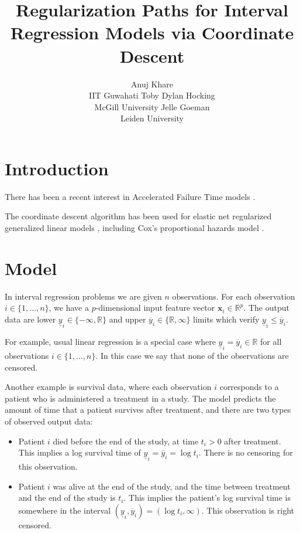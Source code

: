 \documentclass[article]{jss}
\author{Anuj Khare\\IIT Guwahati \And
        Toby Dylan Hocking\\McGill University \And
        Jelle Goeman \\Leiden University}
\title{Regularization Paths for Interval Regression Models via Coordinate Descent}
\newcommand{\RR}{\mathbb R}
\begin{document}

\section{Introduction}

There has been a recent interest in Accelerated Failure Time models
\citep{huang05, cai09, khan13}.

The coordinate descent algorithm has been used for elastic net
regularized generalized linear models \citep{glmnet}, including Cox's
proportional hazards model \citep{coxnet}.

\section{Model}

In interval regression problems we are given $n$ observations. For
each observation $i\in\{1, \dots, n\}$, we have a $p$-dimensional
input feature vector $\mathbf x_i \in \RR^p$. The output data are
lower $\underline y_i\in\{-\infty, \RR\}$ and upper
$\overline y_i\in\{\RR,\infty\}$ limits which verify
$\underline y_i \leq \overline y_i$.

For example, usual linear regression is a special case where
$\underline y_i = \overline y_i\in\RR$ for all observations
$i\in\{1, \dots, n\}$. In this case we say that none of the
observations are censored.

Another example is survival data, where each observation $i$
corresponds to a patient who is administered a treatment in a
study. The model predicts the amount of time that a patient survives
after treatment, and there are two types of observed output data:
\begin{itemize}
\item Patient $i$ died before the end of the study, at time $t_i>0$
  after treatment. This implies a log survival time of
  $\underline y_i= \overline y_i = \log t_i$. There is no censoring
  for this observation.
\item Patient $i$ was alive at the end of the study, and the time
  between treatment and the end of the study is $t_i$. This implies
  the patient's log survival time is somewhere in the interval
  $(\underline y_i, \overline y_i) = (\log t_i, \infty)$. This
  observation is right censored.
\end{itemize}
\end{document}
